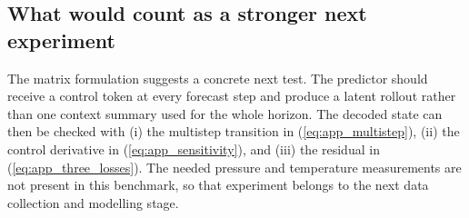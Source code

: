 \documentclass[10pt,journal]{IEEEtran}
\begin{document}
\subsection{What would count as a stronger next experiment}
The matrix formulation suggests a concrete next test. The predictor should receive a control token at every forecast step and produce a latent rollout rather than one context summary used for the whole horizon. The decoded state can then be checked with (i) the multistep transition in (\ref{eq:app_multistep}), (ii) the control derivative in (\ref{eq:app_sensitivity}), and (iii) the residual in (\ref{eq:app_three_losses}). The needed pressure and temperature measurements are not present in this benchmark, so that experiment belongs to the next data collection and modelling stage.

\twocolumn
\end{document}
